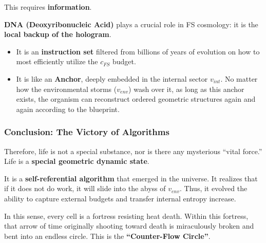 This requires \textbf{information}.

\textbf{DNA (Deoxyribonucleic Acid)} plays a crucial role in FS cosmology: it is the \textbf{local backup of the hologram}.

\begin{itemize}
\item It is an \textbf{instruction set} filtered from billions of years of evolution on how to most efficiently utilize the $c_{FS}$ budget.

\item It is like an \textbf{Anchor}, deeply embedded in the internal sector $v_{int}$. No matter how the environmental storms ($v_{env}$) wash over it, as long as this anchor exists, the organism can reconstruct ordered geometric structures again and again according to the blueprint.
\end{itemize}

\subsubsection{Conclusion: The Victory of Algorithms}

Therefore, life is not a special substance, nor is there any mysterious ``vital force.'' Life is a \textbf{special geometric dynamic state}.

It is a \textbf{self-referential algorithm} that emerged in the universe. It realizes that if it does not do work, it will slide into the abyss of $v_{env}$. Thus, it evolved the ability to capture external budgets and transfer internal entropy increase.

In this sense, every cell is a fortress resisting heat death. Within this fortress, that arrow of time originally shooting toward death is miraculously broken and bent into an endless circle. This is the \textbf{``Counter-Flow Circle''}.

